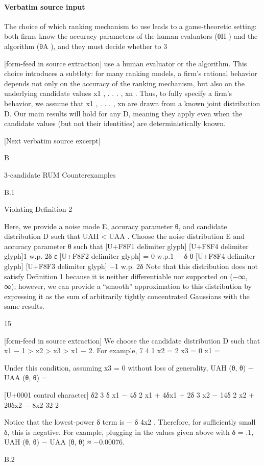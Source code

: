 \documentclass[10pt]{article}
\begin{document}
\paragraph{Verbatim source input}
\begin{ReviewVerbatim}
The choice of which ranking mechanism to use leads to a game-theoretic setting: both firms know the
accuracy parameters of the human evaluators (θH ) and the algorithm (θA ), and they must decide whether to
3


[form-feed in source extraction]
use a human evaluator or the algorithm. This choice introduces a subtlety: for many ranking models, a firm’s
rational behavior depends not only on the accuracy of the ranking mechanism, but also on the underlying
candidate values x1 , . . . , xn . Thus, to fully specify a firm’s behavior, we assume that x1 , . . . , xn are drawn
from a known joint distribution D. Our main results will hold for any D, meaning they apply even when the
candidate values (but not their identities) are deterministically known.

[Next verbatim source excerpt]

B

3-candidate RUM Counterexamples

B.1

Violating Definition 2

Here, we provide a noise mode E, accuracy parameter θ, and candidate distribution D such that UAH < UAA .
Choose the noise distribution E and accuracy parameter θ such that
[U+F8F1 delimiter glyph]
[U+F8F4 delimiter glyph]1
w.p. 2δ
ε [U+F8F2 delimiter glyph]
= 0
w.p.1 − δ
θ [U+F8F4 delimiter glyph]
[U+F8F3 delimiter glyph]
−1 w.p. 2δ
Note that this distribution does not satisfy Definition 1 because it is neither differentiable nor supported on
(−∞, ∞); however, we can provide a “smooth” approximation to this distribution by expressing it as the
sum of arbitrarily tightly concentrated Gaussians with the same results.

15


[form-feed in source extraction]
We choose the candidate distribution D such that x1 − 1 > x2 > x3 > x1 − 2. For example,
7
4
1
x2 =
2
x3 = 0
x1 =

Under this condition, assuming x3 = 0 without loss of generality,
UAH (θ, θ) − UAA (θ, θ) =

[U+0001 control character]
δ2 3
δ x1 − 4δ 2 x1 + 4δx1 + 2δ 3 x2 − 14δ 2 x2 + 20δx2 − 8x2
32
2

Notice that the lowest-power δ term is − δ 4x2 . Therefore, for sufficiently small δ, this is negative. For
example, plugging in the values given above with δ = .1, UAH (θ, θ) − UAA (θ, θ) ≈ −0.00076.

B.2
\end{ReviewVerbatim}
\end{document}
